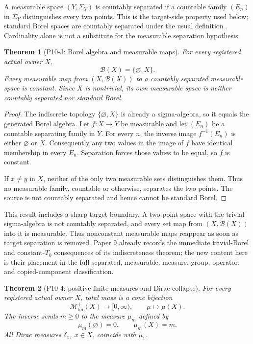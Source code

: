 \documentclass[11pt]{article}
\newtheorem{theorem}{Theorem}[section]
\theoremstyle{definition}
\newcommand{\Borel}{\mathcal B}
\newcommand{\Mfin}{\mathcal M_{\mathrm{fin}}^+}
\begin{document}
A measurable space $(Y,\Sigma_Y)$ is countably separated if a countable family $(E_n)$ in $\Sigma_Y$ distinguishes every two points.  This is the target-side property used below; standard Borel spaces are countably separated under the usual definition \cite[physical p.~3 and Section~3, physical p.~13]{Preston2008}.  Cardinality alone is not a substitute for the measurable separation hypothesis.

\begin{theorem}[P10-3: Borel algebra and measurable maps]
\label{thm:borel}
For every registered actual owner $X$,
\[
 \Borel(X)=\{\varnothing,X\}.
\]
Every measurable map from $(X,\Borel(X))$ to a countably separated measurable space is constant.  Since $X$ is nontrivial, its own measurable space is neither countably separated nor standard Borel.
\end{theorem}

\begin{proof}
The indiscrete topology $\{\varnothing,X\}$ is already a sigma-algebra, so it equals the generated Borel algebra.  Let $f:X\to Y$ be measurable and let $(E_n)$ be a countable separating family in $Y$.  For every $n$, the inverse image $f^{-1}(E_n)$ is either $\varnothing$ or $X$.  Consequently any two values in the image of $f$ have identical membership in every $E_n$.  Separation forces those values to be equal, so $f$ is constant.

If $x\ne y$ in $X$, neither of the only two measurable sets distinguishes them.  Thus no measurable family, countable or otherwise, separates the two points.  The source is not countably separated and hence cannot be standard Borel.
\end{proof}

This result includes a sharp target boundary.  A two-point space with the trivial sigma-algebra is not countably separated, and every set map from $(X,\Borel(X))$ into it is measurable.  Thus nonconstant measurable maps reappear as soon as target separation is removed.  Paper 9 already records the immediate trivial-Borel and constant-$T_0$ consequences of its indiscreteness theorem; the new content here is their placement in the full separated, measurable, measure, group, operator, and copied-component classification.

\begin{theorem}[P10-4: positive finite measures and Dirac collapse]
\label{thm:mfin}
For every registered actual owner $X$, total mass is a cone bijection
\[
 \Mfin(X)\longrightarrow[0,\infty),\qquad \mu\longmapsto\mu(X).
\]
The inverse sends $m\ge0$ to the measure $\mu_m$ defined by
\[
 \mu_m(\varnothing)=0,\qquad \mu_m(X)=m.
\]
All Dirac measures $\delta_x$, $x\in X$, coincide with $\mu_1$.
\end{theorem}
\end{document}

